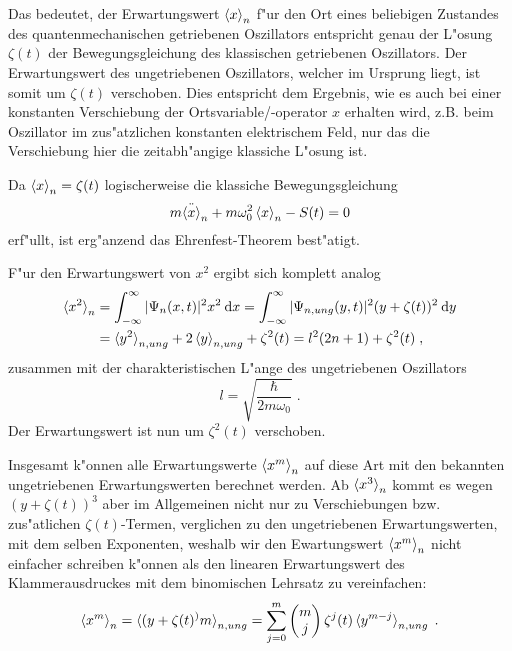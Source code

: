     Das bedeutet, der Erwartungswert $\braket{x}_n$ f"ur den Ort eines beliebigen Zustandes des quantenmechanischen getriebenen Oszillators entspricht genau der L"osung $\zeta(t)$ der Bewegungsgleichung des klassischen getriebenen Oszillators.
    Der Erwartungswert des ungetriebenen Oszillators, welcher im Ursprung liegt, ist somit um $\zeta(t)$ verschoben.
    Dies entspricht dem Ergebnis, wie es auch bei einer konstanten Verschiebung der Ortsvariable/-operator $x$ erhalten wird, z.B. beim Oszillator im zus"atzlichen konstanten elektrischem Feld, nur das die Verschiebung hier die zeitabh"angige klassiche L"osung ist.

    Da $\braket{x}_n=\zeta(t)$ logischerweise die klassiche Bewegungsgleichung
    \begin{equation}
      m\ddot{\braket{x}}_n + m\omega_0^2\braket{x}_n - S(t) = 0
    \end{equation}
    erf"ullt, ist erg"anzend das Ehrenfest-Theorem best"atigt.

    F"ur den Erwartungswert von $x^2$ ergibt sich komplett analog
    \begin{align}
      \braket{x^2}_n &= \int_{-\infty}^{\infty} |\Psi_n(x,t)|^2 x^2 \: \text dx
      = \int_{-\infty}^{\infty} |\Psi_{n,ung}(y,t)|^2 (y+\zeta(t))^2 \: \text dy \notag \\
      &= \braket{y^2}_{n,ung} + 2\braket{y}_{n,ung} + \zeta^2(t)
      = l^2(2n+1) + \zeta^2(t) \; ,
    \end{align}
    zusammen mit der charakteristischen L"ange des ungetriebenen Oszillators
    \begin{equation}
      l = \sqrt{\frac{\hbar}{2m\omega_0}} \; .
    \end{equation}
    Der Erwartungswert ist nun um $\zeta^2(t)$ verschoben.

    Insgesamt k"onnen alle Erwartungswerte $\braket{x^m}_n$ auf diese Art mit den bekannten ungetriebenen Erwartungswerten berechnet werden.
    Ab $\braket{x^3}_n$ kommt es wegen $(y+\zeta(t))^3$ aber im Allgemeinen nicht nur zu Verschiebungen bzw. zus"atlichen $\zeta(t)$-Termen, verglichen zu den ungetriebenen Erwartungswerten, mit dem selben Exponenten, weshalb wir den Ewartungswert $\braket{x^m}_n$ nicht einfacher schreiben k"onnen als den linearen Erwartungswert des Klammerausdruckes mit dem binomischen Lehrsatz \cite{binom} zu vereinfachen:
    \begin{equation}
      \braket{x^m}_n = \braket{(y+\zeta(t)^)m}_{n,ung} = \sum_{j=0}^m \begin{pmatrix} m \\ j \\ \end{pmatrix} \zeta^j(t)\braket{y^{m-j}}_{n,ung} \; .
    \end{equation}





